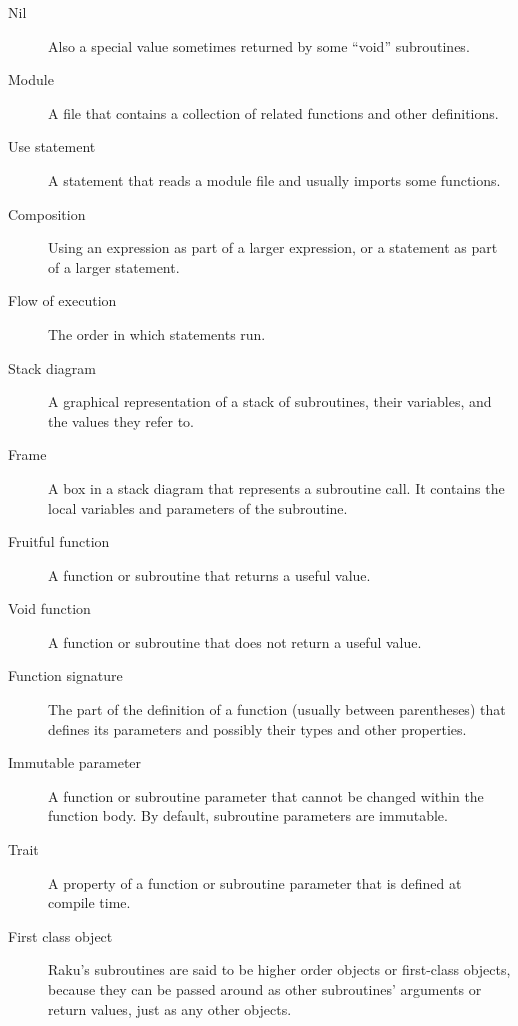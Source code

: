 \begin{description}
\item[Nil] Also a special value sometimes returned by some 
``void'' subroutines.

\item[Module] A file that contains a
collection of related functions and other definitions.

\item[Use statement] A statement that reads a module file and usually imports some functions.

\item[Composition] Using an expression as part of a larger expression,
or a statement as part of a larger statement.

\item[Flow of execution]  The order in which statements run.

\item[Stack diagram]  A graphical representation of a stack of subroutines,
their variables, and the values they refer to.

\item[Frame]  A box in a stack diagram that represents a subroutine call.
It contains the local variables and parameters of the subroutine.

\item[Fruitful function] A function or subroutine that returns a useful value.

\item[Void function] A function or subroutine that does not 
return a useful value.

\item[Function signature] The part of the definition of a 
function (usually between parentheses) that defines its 
parameters and possibly their types and other properties.

\item[Immutable parameter] A function or subroutine parameter 
that cannot be changed within the function body. By default, 
subroutine parameters are immutable.

\item[Trait] A property of a function or subroutine parameter 
that is defined at compile time.

\item[First class object] Raku's subroutines are said to be
higher order objects or first-class objects, because they can 
be passed around as other subroutines' arguments or return values, 
just as any other objects.


\end{description}
